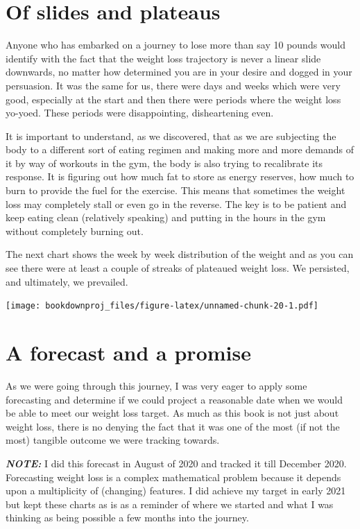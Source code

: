\documentclass[
  oneside]{book}
\begin{document}
\hypertarget{of-slides-and-plateaus}{%
\section{Of slides and plateaus}\label{of-slides-and-plateaus}}

Anyone who has embarked on a journey to lose more than say 10 pounds would identify with the fact that the weight loss trajectory is never a linear slide downwards, no matter how determined you are in your desire and dogged in your persuasion. It was the same for us, there were days and weeks which were very good, especially at the start and then there were periods where the weight loss yo-yoed. These periods were disappointing, disheartening even.

It is important to understand, as we discovered, that as we are subjecting the body to a different sort of eating regimen and making more and more demands of it by way of workouts in the gym, the body is also trying to recalibrate its response. It is figuring out how much fat to store as energy reserves, how much to burn to provide the fuel for the exercise. This means that sometimes the weight loss may completely stall or even go in the reverse. The key is to be patient and keep eating clean (relatively speaking) and putting in the hours in the gym without completely burning out.

The next chart shows the week by week distribution of the weight and as you can see there were at least a couple of streaks of plateaued weight loss. We persisted, and ultimately, we prevailed.

\texttt{[image: bookdownproj\_files/figure-latex/unnamed-chunk-20-1.pdf]}

\hypertarget{a-forecast-and-a-promise}{%
\section{A forecast and a promise}\label{a-forecast-and-a-promise}}

As we were going through this journey, I was very eager to apply some forecasting and determine if we could project a reasonable date when we would be able to meet our weight loss target. As much as this book is not just about weight loss, there is no denying the fact that it was one of the most (if not the most) tangible outcome we were tracking towards.

\textbf{\emph{NOTE:}} I did this forecast in August of 2020 and tracked it till December 2020. Forecasting weight loss is a complex mathematical problem because it depends upon a multiplicity of (changing) features. I did achieve my target in early 2021 but kept these charts as is as a reminder of where we started and what I was thinking as being possible a few months into the journey.
\end{document}
